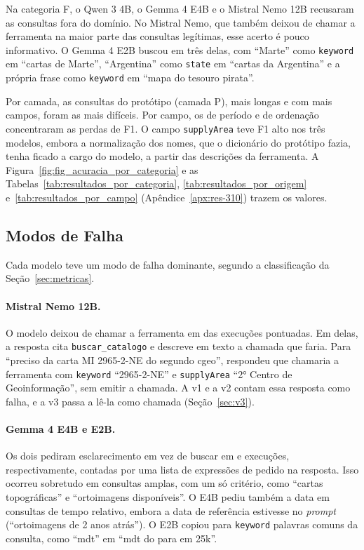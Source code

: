 Na categoria F, o Qwen 3 4B, o Gemma 4 E4B e o Mistral Nemo 12B recusaram as  consultas fora do domínio. No Mistral Nemo, que também deixou de chamar a ferramenta na maior parte das consultas legítimas, esse acerto é pouco informativo. O Gemma 4 E2B buscou em três delas, com ``Marte'' como \texttt{keyword} em ``cartas de Marte'', ``Argentina'' como \texttt{state} em ``cartas da Argentina'' e a própria frase como \texttt{keyword} em ``mapa do tesouro pirata''.

Por camada, as consultas do protótipo (camada P), mais longas e com mais campos, foram as mais difíceis. Por campo, os de período e de ordenação concentraram as perdas de F1. O campo \texttt{supplyArea} teve F1 alto nos três modelos, embora a normalização dos nomes, que o dicionário do protótipo fazia, tenha ficado a cargo do modelo, a partir das descrições da ferramenta. A Figura~\ref{fig:fig_acuracia_por_categoria} e as Tabelas~\ref{tab:resultados_por_categoria}, \ref{tab:resultados_por_origem} e~\ref{tab:resultados_por_campo} (Apêndice~\ref{apx:res-310}) trazem os valores.

\subsection{Modos de Falha}
\label{sec:analise-erros}
\label{sec:observacionais}

Cada modelo teve um modo de falha dominante, segundo a classificação da Seção~\ref{sec:metricas}.

\paragraph{Mistral Nemo 12B.} O modelo deixou de chamar a ferramenta em  das  execuções pontuadas. Em  delas, a resposta cita \texttt{buscar\_catalogo} e descreve em texto a chamada que faria. Para ``preciso da carta MI 2965-2-NE do segundo cgeo'', respondeu que chamaria a ferramenta com \texttt{keyword} ``2965-2-NE'' e \texttt{supplyArea} ``2° Centro de Geoinformação'', sem emitir a chamada. A v1 e a v2 contam essa resposta como falha, e a v3 passa a lê-la como chamada (Seção~\ref{sec:v3}).

\paragraph{Gemma 4 E4B e E2B.} Os dois pediram esclarecimento em vez de buscar em  e  execuções, respectivamente, contadas por uma lista de expressões de pedido na resposta. Isso ocorreu sobretudo em consultas amplas, com um só critério, como ``cartas topográficas'' e ``ortoimagens disponíveis''. O E4B pediu também a data em consultas de tempo relativo, embora a data de referência estivesse no \textit{prompt} (``ortoimagens de 2 anos atrás''). O E2B copiou para \texttt{keyword} palavras comuns da consulta, como ``mdt'' em ``mdt do para em 25k''.

